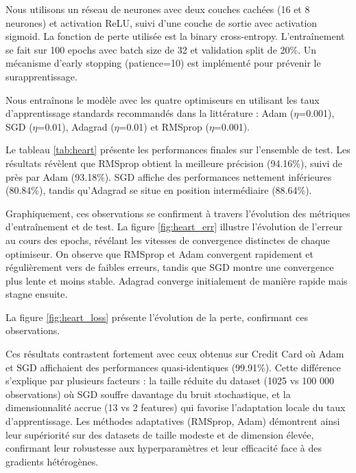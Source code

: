 \documentclass[a4paper,12pt]{article}
\begin{document}
Nous utilisons un réseau de neurones avec deux couches cachées (16 et 8 neurones) et activation ReLU, suivi d'une couche de sortie avec activation sigmoid. La fonction de perte utilisée est la binary cross-entropy. L'entraînement se fait sur 100 epochs avec batch size de 32 et validation split de 20\%. Un mécanisme d'early stopping (patience=10) est implémenté pour prévenir le surapprentissage.

Nous entraînons le modèle avec les quatre optimiseurs en utilisant les taux d'apprentissage standards recommandés dans la littérature \cite{ruder2016overview} : Adam ($\eta$=0.001), SGD ($\eta$=0.01), Adagrad ($\eta$=0.01) et RMSprop ($\eta$=0.001).

\par Le tableau \ref{tab:heart} présente les performances finales sur l'ensemble de test. Les résultats révèlent que RMSprop obtient la meilleure précision (94.16\%), suivi de près par Adam (93.18\%). SGD affiche des performances nettement inférieures (80.84\%), tandis qu'Adagrad se situe en position intermédiaire (88.64\%). \\

\par Graphiquement, ces observations se confirment à travers l'évolution des métriques d'entraînement et de test. La figure \ref{fig:heart_err} illustre l'évolution de l'erreur au cours des epochs, révélant les vitesses de convergence distinctes de chaque optimiseur. On observe que RMSprop et Adam convergent rapidement et régulièrement vers de faibles erreurs, tandis que SGD montre une convergence plus lente et moins stable. Adagrad converge initialement de manière rapide mais stagne ensuite. \\

\par La figure \ref{fig:heart_loss} présente l'évolution de la perte, confirmant ces observations.

\par Ces résultats contrastent fortement avec ceux obtenus sur Credit Card où Adam et SGD affichaient des performances quasi-identiques (99.91\%). Cette différence s'explique par plusieurs facteurs : la taille réduite du dataset (1025 vs 100 000 observations) où SGD souffre davantage du bruit stochastique, et la dimensionnalité accrue (13 vs 2 features) qui favorise l'adaptation locale du taux d'apprentissage. Les méthodes adaptatives (RMSprop, Adam) démontrent ainsi leur supériorité sur des datasets de taille modeste et de dimension élevée, confirmant leur robustesse aux hyperparamètres et leur efficacité face à des gradients hétérogènes.
\end{document}

